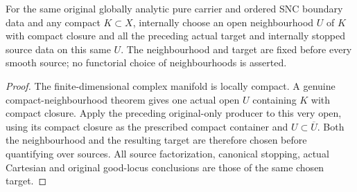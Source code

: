 \begin{theorem}
\label{hir:original-local-pure-boundary-compact-neighbourhood-internal-source}
For the same original globally analytic pure carrier and ordered SNC
boundary data and any compact $K\subset X$, internally choose an open
neighbourhood $U$ of $K$ with compact closure and all the preceding
actual target and internally stopped source data on this same $U$.
The neighbourhood and target are fixed before every smooth source;
no functorial choice of neighbourhoods is asserted.
\leanok
\end{theorem}
\begin{proof}
The finite-dimensional complex manifold is locally compact. A genuine
compact-neighbourhood theorem gives one actual open $U$ containing
$K$ with compact closure. Apply the preceding original-only producer
to this very open, using its compact closure as the prescribed compact
container and $U\subset\overline U$. Both the neighbourhood and the
resulting target are therefore chosen before quantifying over sources.
All source factorization, canonical stopping, actual Cartesian and
original good-locus conclusions are those of the same chosen target.
\end{proof}

